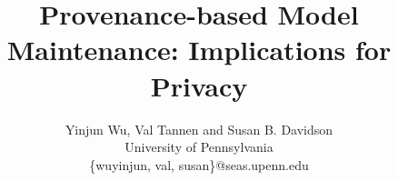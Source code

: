 \documentclass[11pt]{article}
\begin{document}
\title{Provenance-based Model Maintenance: Implications for Privacy}




\author{
  Yinjun Wu, Val Tannen and Susan B. Davidson\\
  University of Pennsylvania\\
  {\{wuyinjun, val, susan\}@seas.upenn.edu}
}


\maketitle
\end{document}
